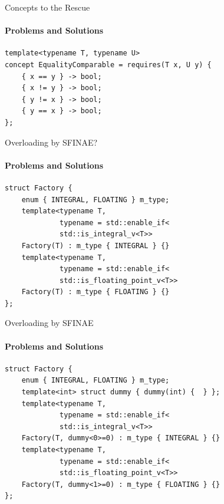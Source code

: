\documentclass{beamer}
\let\svthefootnote\thefootnote
\newcommand\blankfootnote[1]{%
  \let\thefootnote\relax\footnotetext{#1}%
  \let\thefootnote\svthefootnote%
}
\let\svfootnote\footnote
\renewcommand\footnote[2][?]{%
  \if\relax#1\relax%
    \blankfootnote{#2}%
  \else%
    \if?#1\svfootnote{#2}\else\svfootnote[#1]{#2}\fi%
  \fi
}
\renewcommand*{\thefootnote}{\fnsymbol{footnote}}
\begin{document}
    \begin{frame}[fragile]{Concepts to the Rescue}
        \framesubtitle{Problems and Solutions}
        \begin{center}
        \begin{lstlisting}[caption={\texttt{EqualityComparable} concept which ``satisfies''\footnote{not really; see the Ranges TS, this is \texttt{WeaklyEqualityComparable} \texttt{:)}} Table 1.}]
template<typename T, typename U>
concept EqualityComparable = requires(T x, U y) {
    { x == y } -> bool;
    { x != y } -> bool;
    { y != x } -> bool;
    { y == x } -> bool;
}; \end{lstlisting}
        \end{center}
    \end{frame}

    \begin{frame}[fragile]{Overloading by SFINAE?}
        \framesubtitle{Problems and Solutions}
        \begin{center}
        \begin{lstlisting}[caption={overloading the constructor by using SFINAE \& type traits...}]
struct Factory {
    enum { INTEGRAL, FLOATING } m_type;
    template<typename T,
             typename = std::enable_if<
             std::is_integral_v<T>>
    Factory(T) : m_type { INTEGRAL } {}
    template<typename T,
             typename = std::enable_if<
             std::is_floating_point_v<T>>
    Factory(T) : m_type { FLOATING } {}
}; \end{lstlisting}
        \end{center}
    \end{frame}

    \begin{frame}[fragile]{Overloading by SFINAE}
        \framesubtitle{Problems and Solutions}
        \begin{center}
        \begin{lstlisting}[caption={...doesn't work if we don't use a \texttt{dummy} for disambiguation.}]
struct Factory {
    enum { INTEGRAL, FLOATING } m_type;
    template<int> struct dummy { dummy(int) {  } };
    template<typename T,
             typename = std::enable_if<
             std::is_integral_v<T>>
    Factory(T, dummy<0>=0) : m_type { INTEGRAL } {}
    template<typename T,
             typename = std::enable_if<
             std::is_floating_point_v<T>>
    Factory(T, dummy<1>=0) : m_type { FLOATING } {}
}; \end{lstlisting}
        \end{center}
    \end{frame}
\end{document}
